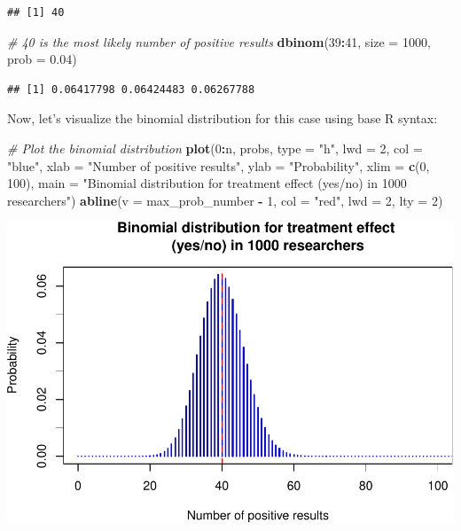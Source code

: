 \documentclass[
]{book}
\newenvironment{Shaded}{\begin{snugshade}}{\end{snugshade}}
\newcommand{\AttributeTok}[1]{\textcolor[rgb]{0.13,0.29,0.53}{#1}}
\newcommand{\CommentTok}[1]{\textcolor[rgb]{0.56,0.35,0.01}{\textit{#1}}}
\newcommand{\DecValTok}[1]{\textcolor[rgb]{0.00,0.00,0.81}{#1}}
\newcommand{\FloatTok}[1]{\textcolor[rgb]{0.00,0.00,0.81}{#1}}
\newcommand{\FunctionTok}[1]{\textcolor[rgb]{0.13,0.29,0.53}{\textbf{#1}}}
\newcommand{\NormalTok}[1]{#1}
\newcommand{\SpecialCharTok}[1]{\textcolor[rgb]{0.81,0.36,0.00}{\textbf{#1}}}
\newcommand{\StringTok}[1]{\textcolor[rgb]{0.31,0.60,0.02}{#1}}
\newcommand{\pandocbounded}[1]{#1}
\begin{document}
\begin{verbatim}
## [1] 40
\end{verbatim}

\begin{Shaded}
\begin{Highlighting}[]
\CommentTok{\# 40 is the most likely number of positive results}
\FunctionTok{dbinom}\NormalTok{(}\DecValTok{39}\SpecialCharTok{:}\DecValTok{41}\NormalTok{, }\AttributeTok{size =} \DecValTok{1000}\NormalTok{, }\AttributeTok{prob =} \FloatTok{0.04}\NormalTok{)}
\end{Highlighting}
\end{Shaded}

\begin{verbatim}
## [1] 0.06417798 0.06424483 0.06267788
\end{verbatim}

Now, let's visualize the binomial distribution for this case using base R syntax:

\begin{Shaded}
\begin{Highlighting}[]
\CommentTok{\# Plot the binomial distribution}
\FunctionTok{plot}\NormalTok{(}\DecValTok{0}\SpecialCharTok{:}\NormalTok{n, probs, }\AttributeTok{type =} \StringTok{"h"}\NormalTok{, }\AttributeTok{lwd =} \DecValTok{2}\NormalTok{, }\AttributeTok{col =} \StringTok{"blue"}\NormalTok{,}
     \AttributeTok{xlab =} \StringTok{"Number of positive results"}\NormalTok{,}
     \AttributeTok{ylab =} \StringTok{"Probability"}\NormalTok{,}
     \AttributeTok{xlim =} \FunctionTok{c}\NormalTok{(}\DecValTok{0}\NormalTok{, }\DecValTok{100}\NormalTok{),}
     \AttributeTok{main =} \StringTok{"Binomial distribution for treatment effect }
\StringTok{     (yes/no) in 1000 researchers"}\NormalTok{)}
\FunctionTok{abline}\NormalTok{(}\AttributeTok{v =}\NormalTok{ max\_prob\_number }\SpecialCharTok{{-}} \DecValTok{1}\NormalTok{, }\AttributeTok{col =} \StringTok{"red"}\NormalTok{, }\AttributeTok{lwd =} \DecValTok{2}\NormalTok{, }\AttributeTok{lty =} \DecValTok{2}\NormalTok{)}
\end{Highlighting}
\end{Shaded}

\pandocbounded{\includegraphics[keepaspectratio]{_main_files/figure-latex/unnamed-chunk-7-1.pdf}}
\end{document}
